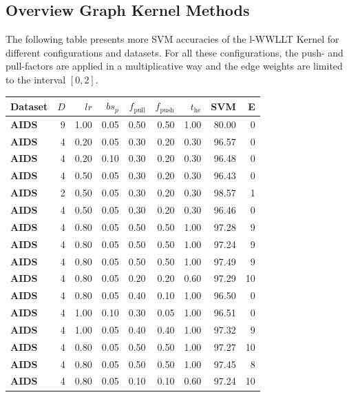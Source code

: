 \subsection{Overview Graph Kernel Methods} \label{Asub:SVMacc}
	The following table presents more SVM accuracies of the l-WWLLT Kernel for different configurations and datasets.
	For all these configurations, the push- and pull-factors are applied in a multiplicative way and the edge weights are limited to the interval $[0,2]$.
	\begin{longtable}{|l||r|r|r|r|r|r||r|r|}
		\hline
		\textbf{Dataset} & $D$ & $lr$ & $bs_p$ & $f_{\text{pull}}$ & $f_{\text{push}}$ & $t_{\text{he}}$ & \textbf{SVM} & E \\ \hline\hline
		\textbf{AIDS} & 9 & 1.00 & 0.05 & 0.50 & 0.50 & 1.00 & 80.00 & 0 \\ \hline
		\textbf{AIDS} & 4 & 0.20 & 0.05 & 0.30 & 0.20 & 0.30 & 96.57 & 0 \\ \hline
		\textbf{AIDS} & 4 & 0.20 & 0.10 & 0.30 & 0.20 & 0.30 & 96.48 & 0 \\ \hline
		\textbf{AIDS} & 4 & 0.50 & 0.05 & 0.30 & 0.20 & 0.30 & 96.43 & 0 \\ \hline
		\textbf{AIDS} & 2 & 0.50 & 0.05 & 0.30 & 0.20 & 0.30 & 98.57 & 1 \\ \hline
		\textbf{AIDS} & 4 & 0.50 & 0.05 & 0.30 & 0.20 & 0.30 & 96.46 & 0 \\ \hline
		\textbf{AIDS} & 4 & 0.80 & 0.05 & 0.50 & 0.50 & 1.00 & 97.28 & 9 \\ \hline
		\textbf{AIDS} & 4 & 0.80 & 0.05 & 0.50 & 0.50 & 1.00 & 97.24 & 9 \\ \hline
		\textbf{AIDS} & 4 & 0.80 & 0.05 & 0.50 & 0.50 & 1.00 & 97.49 & 9 \\ \hline
		\textbf{AIDS} & 4 & 0.80 & 0.05 & 0.20 & 0.20 & 0.60 & 97.29 & 10 \\ \hline
		\textbf{AIDS} & 4 & 0.80 & 0.05 & 0.40 & 0.10 & 1.00 & 96.50 & 0 \\ \hline
		\textbf{AIDS} & 4 & 1.00 & 0.10 & 0.30 & 0.05 & 1.00 & 96.51 & 0 \\ \hline
		\textbf{AIDS} & 4 & 1.00 & 0.05 & 0.40 & 0.40 & 1.00 & 97.32 & 9 \\ \hline
		\textbf{AIDS} & 4 & 0.80 & 0.05 & 0.50 & 0.50 & 1.00 & 97.27 & 10 \\ \hline
		\textbf{AIDS} & 4 & 0.80 & 0.05 & 0.50 & 0.50 & 1.00 & 97.45 & 8 \\ \hline
		\textbf{AIDS} & 4 & 0.80 & 0.05 & 0.10 & 0.10 & 0.60 & 97.24 & 10 \\ \hline

\end{longtable}

